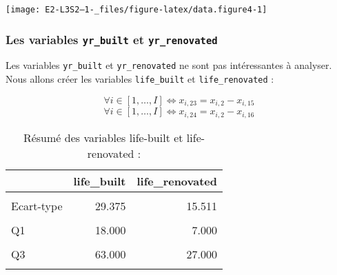 \documentclass[
  11pt,
  french,
]{article}
\newenvironment{Shaded}{\begin{snugshade}}{\end{snugshade}}
\newcommand{\DecValTok}[1]{\textcolor[rgb]{0.00,0.00,0.81}{#1}}
\newcommand{\NormalTok}[1]{#1}
\newcommand{\OperatorTok}[1]{\textcolor[rgb]{0.81,0.36,0.00}{\textbf{#1}}}
\newcommand{\StringTok}[1]{\textcolor[rgb]{0.31,0.60,0.02}{#1}}
\begin{document}
\begin{center}\texttt{[image: E2-L3S2--1-\_files/figure-latex/data.figure4-1]} \end{center}

\newpage

\hypertarget{les-variables-yr_built-et-yr_renovated}{%
\subsubsection{\texorpdfstring{Les variables \texttt{yr\_built} et
\texttt{yr\_renovated}}{Les variables yr\_built et yr\_renovated}}\label{les-variables-yr_built-et-yr_renovated}}

Les variables \texttt{yr\_built} et \texttt{yr\_renovated} ne sont pas
intéressantes à analyser. Nous allons créer les variables
\texttt{life\_built} et \texttt{life\_renovated} :

\[\forall i \in [1,\ldots,I] \iff x_{i,23}=x_{i,2}-x_{i,15}\]
\[\forall i \in [1,\ldots,I] \iff x_{i,24}=x_{i,2}-x_{i,16}\]

\begin{Shaded}
\end{Shaded}

\begin{table}[!h]

\caption{\label{tab:unnamed-chunk-6}Résumé des variables life-built et life-renovated :}
\centering
\begin{tabular}[t]{lrr}
\toprule
  & life\_built & life\_renovated\\
\midrule
\cellcolor{gray!6}{Moyenne} & \cellcolor{gray!6}{43.318} & \cellcolor{gray!6}{18.492}\\
Ecart-type & 29.375 & 15.511\\
\cellcolor{gray!6}{Minimum} & \cellcolor{gray!6}{-1.000} & \cellcolor{gray!6}{-1.000}\\
Q1 & 18.000 & 7.000\\
\cellcolor{gray!6}{Q2} & \cellcolor{gray!6}{40.000} & \cellcolor{gray!6}{15.000}\\
\addlinespace
Q3 & 63.000 & 27.000\\
\cellcolor{gray!6}{Maximum} & \cellcolor{gray!6}{115.000} & \cellcolor{gray!6}{81.000}\\
\bottomrule
\end{tabular}
\end{table}
\end{document}
